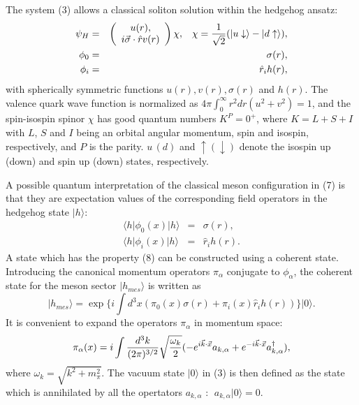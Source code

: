 The system (3) allows a classical soliton solution within the hedgehog
ansatz:
\begin{eqnarray}
\psi _H & = & \left( \begin{array}{c}
                 u(r) , \\
                 i\vec \sigma \cdot \hat r v(r)
                 \end{array} \right)
\chi , \; \; \; \chi = {1 \over {\sqrt 2}}
            (\vert u\downarrow \rangle - \vert d\uparrow \rangle ) ,
                                        \nonumber  \\
\phi _0  & = & \sigma (r) ,  \\
\phi _i  & = & \hat r_i h(r) , \nonumber
\end{eqnarray}
with spherically symmetric functions $u(r), v(r), \sigma (r)$ and $h(r)$.
The valence quark wave function is normalized as $4\pi \int_0^\infty
r^2dr (u^2 + v^2)  =  1$, and the spin-isospin spinor $\chi$ has  good
quantum  numbers $K^P = 0^+$, where $K = L + S + I$ with $L$, $S$
and $I$ being  an orbital  angular  momentum,  spin  and isospin,
respectively,  and $P$ is the parity.   $u \, (d)$  and $\uparrow
(\downarrow  )$ denote the isospin  up (down)  and spin up (down)
states, respectively.

A possible quantum interpretation of the classical meson configuration
in (7) is that they are expectation values of the corresponding field
operators in the hedgehog state $\vert h \rangle$:
\begin{eqnarray}
\langle h \vert \phi _0 (x) \vert h \rangle & = & \sigma (r) ,
                                            \nonumber \\
\langle h \vert \phi _i (x) \vert h \rangle & = & \hat r_i h(r) .
\end{eqnarray}
A state which has the property (8) can be constructed using a coherent
state. Introducing the canonical momentum operators $\pi _\alpha $
conjugate to $\phi _\alpha$,
the coherent state for the meson sector $\vert h_{mes}\rangle $ is
written as \cite{BG}
\begin{equation}
\vert h_{mes} \rangle = \exp \{ i \int d^3x (\pi_0 (x) \sigma (r)
                      + \pi _i (x) \hat r_i h(r) ) \}
                      \vert 0 \rangle .
\end{equation}
It is convenient to expand the operators $\pi _\alpha$ in momentum space:
\begin{equation}
      \pi _\alpha (x) =  i \int {{d^3k} \over {(2\pi)^{3/2}}}
\sqrt{{\omega _k} \over 2} ( - e^{i\vec k \cdot \vec x} a_{k,\alpha}
                    + e^{-i\vec k \cdot \vec x} a_{k,\alpha}^\dagger ) ,
\end{equation}
where $\omega _k = \sqrt{k^2 + m_\pi^2}$.  The vacuum state $\vert 0 \rangle$
in (3) is then defined  as the state which is annihilated  by all
the  opertators  $a_{k,\alpha}$ :   $\; a_{k,\alpha}  \vert  0
\rangle = 0$.

